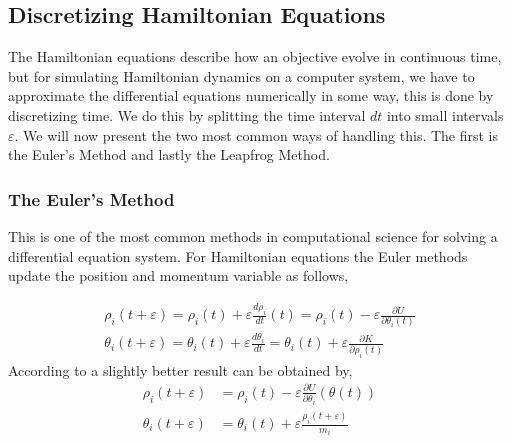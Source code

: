\subsection{Discretizing Hamiltonian Equations}
The Hamiltonian equations describe how an objective evolve in continuous time, but for simulating Hamiltonian dynamics on a computer system, we have to approximate the differential equations numerically in some way, this is done by discretizing time. We do this by splitting the time interval $dt$ into small intervals $\varepsilon$. We will now present the two most common ways of handling this. The first is the Euler's Method and lastly the Leapfrog Method.
\subsubsection*{The Euler’s Method}
This is one of the most common methods in computational science for solving a differential equation system. For Hamiltonian equations the Euler methods update the position and momentum variable as follows,

\begin{equation*}
\begin{split}
\rho_{i}(t+\varepsilon)=\rho_{i}(t)+\varepsilon \frac{d \rho_{i}}{d t}(t)=\rho_{i}(t)-\varepsilon \frac{\partial U}{\partial \theta_{i}(t)} \\
\theta_{i}(t+\varepsilon)=\theta_{i}(t)+\varepsilon \frac{d \theta_{i}}{d t}=\theta_{i}(t)+\varepsilon \frac{\partial K}{\partial \rho_{i}(t)}
\end{split}
\end{equation*}
According to \cite{neal2012mcmc} a slightly better result can be obtained by,
\begin{equation*}
\begin{split}
\rho_{i}(t+\varepsilon) &=\rho_{i}(t)-\varepsilon \frac{\partial U}{\partial \theta_{i}}(\theta(t)) \\
\theta_{i}(t+\varepsilon) &=\theta_{i}(t)+\varepsilon \frac{\rho_{i}(t+\varepsilon)}{m_{i}}
\end{split}
\end{equation*}
